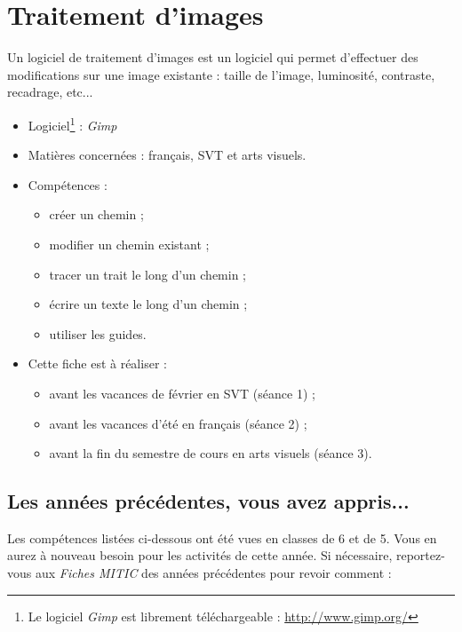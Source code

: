 \chapter{Traitement d'images}  

Un logiciel de traitement d'images est un logiciel qui permet d'effectuer des modifications sur une image existante : taille de l'image, luminosité, contraste, recadrage, etc...\\

{\footnotesize
\begin{itemize}
\item Logiciel\footnote{Le logiciel \emph{Gimp} est librement téléchargeable : \url{http://www.gimp.org/}} : \emph{Gimp}
\item Matières concernées : français, SVT et arts visuels.
\item Compétences : 
        \begin{itemize}
        \item créer un chemin ;
	\item modifier un chemin existant ;
	\item tracer un trait le long d'un chemin ;
	\item écrire un texte le long d'un chemin ;
	\item utiliser les guides.
        \end{itemize}
\item Cette fiche est à réaliser :
        \begin{itemize}
	\item avant les vacances de février en SVT (séance 1) ;
        \item avant les vacances d'été en français (séance 2) ;
        \item avant la fin du semestre de cours en arts visuels (séance 3).
        \end{itemize}
\end{itemize}
} %


\section*{Les années précédentes, vous avez appris...}

Les compétences listées ci-dessous ont été vues en classes de 6 et de 5. Vous en aurez à nouveau besoin pour les activités de cette année. Si nécessaire, reportez-vous aux \emph{Fiches MITIC} des années précédentes pour revoir comment :  

